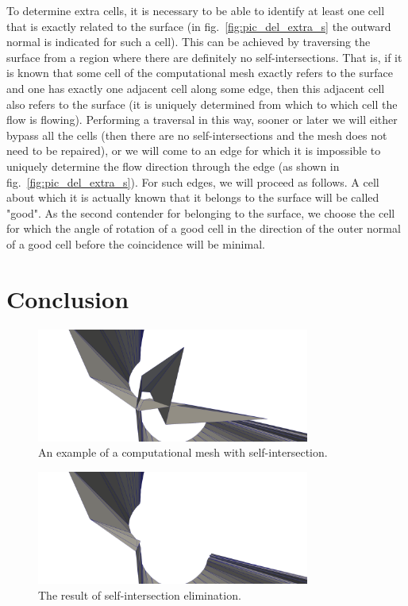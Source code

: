 \documentclass[
11pt,%
tightenlines,%
twoside,%
onecolumn,%
nofloats,%
nobibnotes,%
nofootinbib,%
superscriptaddress,%
noshowpacs,%
centertags]%
{revtex4}
\begin{document}
To determine extra cells, it is necessary to be able to identify at least one cell that is exactly related to the surface (in fig.~\ref{fig:pic_del_extra_s} the outward normal is indicated for such a cell).
This can be achieved by traversing the surface from a region where there are definitely no self-intersections.
That is, if it is known that some cell of the computational mesh exactly refers to the surface and one has exactly one adjacent cell along some edge, then this adjacent cell also refers to the surface (it is uniquely determined from which to which cell the flow is flowing).
Performing a traversal in this way, sooner or later we will either bypass all the cells (then there are no self-intersections and the mesh does not need to be repaired), or we will come to an edge for which it is impossible to uniquely determine the flow direction through the edge (as shown in fig.~\ref{fig:pic_del_extra_s}).
For such edges, we will proceed as follows.
A cell about which it is actually known that it belongs to the surface will be called "good".
As the second contender for belonging to the surface, we choose the cell for which the angle of rotation of a good cell in the direction of the outer normal of a good cell before the coincidence will be minimal.

\section{Conclusion}

\begin{figure}[h]
\includegraphics[width=0.8\textwidth]{pics/pic_example_before.png}
\caption{An example of a computational mesh with self-intersection.}\label{fig:pic_example_before}
\end{figure}

\begin{figure}[h]
\includegraphics[width=0.8\textwidth]{pics/pic_example_after.png}
\caption{The result of self-intersection elimination.}\label{fig:pic_example_after}
\end{figure}
\end{document}
